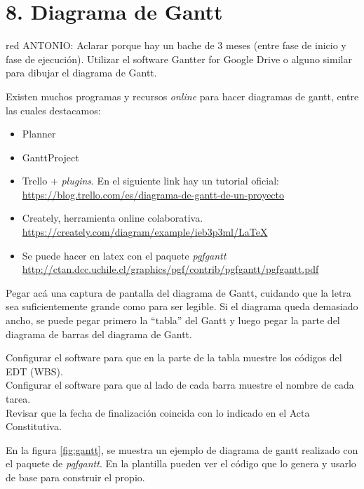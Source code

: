 \documentclass[11pt]{charter}
\begin{document}
\pagebreak
\section{8. Diagrama de Gantt}
\label{sec:gantt}

\begin{consigna}{red}
ANTONIO: Aclarar porque hay un bache de 3 meses (entre fase de inicio y fase de ejecución).
Utilizar el software Gantter for Google Drive o alguno similar para dibujar el diagrama de Gantt.

Existen muchos programas y recursos \textit{online} para hacer diagramas de gantt, entre las cuales destacamos:

\begin{itemize}
\item Planner
\item GanttProject
\item Trello + \textit{plugins}. En el siguiente link hay un tutorial oficial: \\ \url{https://blog.trello.com/es/diagrama-de-gantt-de-un-proyecto}
\item Creately, herramienta online colaborativa. \\\url{https://creately.com/diagram/example/ieb3p3ml/LaTeX}
\item Se puede hacer en latex con el paquete \textit{pgfgantt}\\ \url{http://ctan.dcc.uchile.cl/graphics/pgf/contrib/pgfgantt/pgfgantt.pdf}
\end{itemize}

Pegar acá una captura de pantalla del diagrama de Gantt, cuidando que la letra sea suficientemente grande como para ser legible. 
Si el diagrama queda demasiado ancho, se puede pegar primero la ``tabla'' del Gantt y luego pegar la parte del diagrama de barras del diagrama de Gantt.

Configurar el software para que en la parte de la tabla muestre los códigos del EDT (WBS).\\
Configurar el software para que al lado de cada barra muestre el nombre de cada tarea.\\
Revisar que la fecha de finalización coincida con lo indicado en el Acta Constitutiva.

En la figura \ref{fig:gantt}, se muestra un ejemplo de diagrama de gantt realizado con el paquete de \textit{pgfgantt}. En la plantilla pueden ver el código que lo genera y usarlo de base para construir el propio.


\end{consigna}
\end{document}

